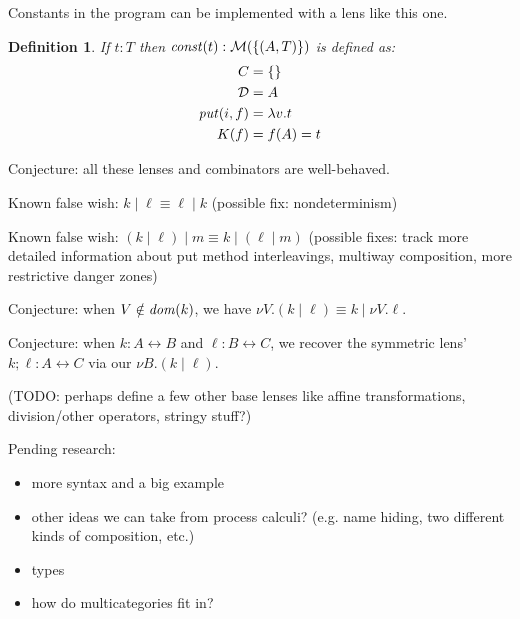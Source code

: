 \documentclass{article}
\newcommand{\lens}{\leftrightarrow}
\newtheorem{definition}{Definition}
\begin{document}
Constants in the program can be implemented with a lens like this one.

\newcommand{\const}{\mathit{const}}
\begin{definition}
    If $t : T$ then $\const(t) : \mlens{\{(A,T)\}}$ is defined as:
    \begin{align*}
        C &= \{\} \\
        \mathcal D &= A \\
        \mathit{put}(i,f) &= \lambda v. t \\
        K(f) &= f(A) = t
    \end{align*}
\end{definition}

Conjecture: all these lenses and combinators are well-behaved.

Known false wish: $k \mid \ell \equiv \ell \mid k$ (possible fix:
nondeterminism)

Known false wish: $(k \mid \ell) \mid m \equiv k \mid (\ell \mid m)$
(possible fixes: track more detailed information about put method
interleavings, multiway composition, more restrictive danger zones)

Conjecture: when $V \notin \mathit{dom}(k)$, we have $\nu V. (k \mid \ell) \equiv
k \mid \nu V. \ell$.

Conjecture: when $k : A \lens B$ and $\ell : B \lens C$, we recover the
symmetric lens' $k;\ell : A \lens C$ via our $\nu B.(k \mid \ell)$.

(TODO: perhaps define a few other base lenses like affine transformations,
division/other operators, stringy stuff?)

Pending research:
\begin{itemize}
    \item more syntax and a big example
    \item other ideas we can take from process calculi? (e.g. name hiding,
        two different kinds of composition, etc.)
    \item types
    \item how do multicategories fit in?
\end{itemize}
\end{document}
